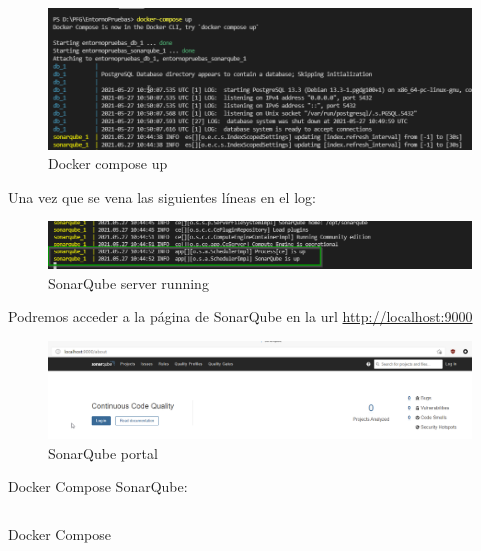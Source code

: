 \begin{figure}[h!]  
    \includegraphics[width=\linewidth]{./imagenes/04_DockerCompose_UP.png}
    \caption{Docker compose up}  
    \label{fig:4}
\end{figure}

Una vez que se vena las siguientes líneas en el log:
\begin{figure}[h!]  
    \includegraphics[width=\linewidth]{./imagenes/05_SonarQubeServerRunning.png}
    \caption{SonarQube server running}  
    \label{fig:5}
\end{figure}
Podremos acceder a la página de SonarQube en 
la url \href{http://localhost:9000}{http://localhost:9000}\\
\begin{figure}[h!]  
    \includegraphics[width=\linewidth]{./imagenes/06_SonarQubeServer_Webpage.png}
    \caption{SonarQube portal}  
    \label{fig:6}
\end{figure}

Docker Compose SonarQube:\\
\begin{listing}[h!]
    \inputminted{yaml}{./EntornoPruebas/SonarQube_8.2/docker-compose.yml}
    \caption{Docker Compose}
    \label{listing:3}
\end{listing}